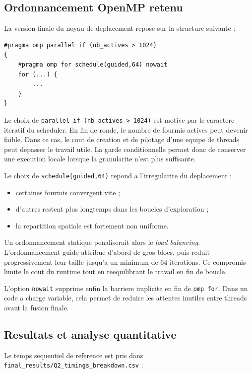 \documentclass[11pt,a4paper]{article}
\begin{document}
\subsection{Ordonnancement OpenMP retenu}

La version finale du noyau de deplacement repose sur la structure suivante :

\begin{verbatim}
#pragma omp parallel if (nb_actives > 1024)
{
    #pragma omp for schedule(guided,64) nowait
    for (...) {
        ...
    }
}
\end{verbatim}

Le choix de \texttt{parallel if (nb\_actives > 1024)} est motive par le caractere iteratif du scheduler. En fin de ronde, le nombre de fourmis actives peut devenir faible. Dans ce cas, le cout de creation et de pilotage d'une equipe de threads peut depasser le travail utile. La garde conditionnelle permet donc de conserver une execution locale lorsque la granularite n'est plus suffisante.

Le choix de \texttt{schedule(guided,64)} repond a l'irregularite du deplacement :

\begin{itemize}[leftmargin=1.2em]
  \item certaines fourmis convergent vite ;
  \item d'autres restent plus longtemps dans les boucles d'exploration ;
  \item la repartition spatiale est fortement non uniforme.
\end{itemize}

Un ordonnancement statique penaliserait alors le \emph{load balancing}. L'ordonnancement guide attribue d'abord de gros blocs, puis reduit progressivement leur taille jusqu'a un minimum de 64 iterations. Ce compromis limite le cout du runtime tout en reequilibrant le travail en fin de boucle.

L'option \texttt{nowait} supprime enfin la barriere implicite en fin de \texttt{omp for}. Dans un code a charge variable, cela permet de reduire les attentes inutiles entre threads avant la fusion finale.

\subsection{Resultats et analyse quantitative}

Le temps sequentiel de reference est pris dans \texttt{final\_results/Q2\_timings\_breakdown.csv} :
\end{document}
